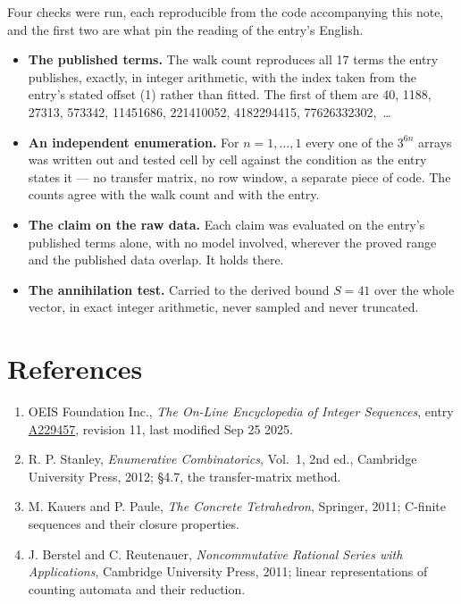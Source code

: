 \documentclass[11pt]{article}
\theoremstyle{definition}
\begin{document}
Four checks were run, each reproducible from the code accompanying this note, and the first two are what pin the reading of the entry's English.

\begin{itemize}

\item {\bfseries The published terms.} The walk count reproduces all 17 terms the entry publishes, exactly, in integer arithmetic, with the index taken from the entry's stated offset (1) rather than fitted. The first of them are 40, 1188, 27313, 573342, 11451686, 221410052, 4182294415, 77626332302,~\dots

\item {\bfseries An independent enumeration.} For $n = 1,\dots,1$ every one of the $3^{6n}$ arrays was written out and tested cell by cell against the condition as the entry states it --- no transfer matrix, no row window, a separate piece of code. The counts agree with the walk count and with the entry.

\item {\bfseries The claim on the raw data.} Each claim was evaluated on the entry's published terms alone, with no model involved, wherever the proved range and the published data overlap. It holds there.

\item {\bfseries The annihilation test.} Carried to the derived bound $S = 41$ over the whole vector, in exact integer arithmetic, never sampled and never truncated.

\end{itemize}

\section{References}

\begin{enumerate}

\item OEIS Foundation Inc., \emph{The On-Line Encyclopedia of Integer Sequences}, entry \href{https://oeis.org/A229457}{A229457}, revision 11, last modified Sep 25 2025.

\item R. P. Stanley, \emph{Enumerative Combinatorics}, Vol.~1, 2nd ed., Cambridge University Press, 2012; \S4.7, the transfer-matrix method.

\item M. Kauers and P. Paule, \emph{The Concrete Tetrahedron}, Springer, 2011; C-finite sequences and their closure properties.

\item J. Berstel and C. Reutenauer, \emph{Noncommutative Rational Series with Applications}, Cambridge University Press, 2011; linear representations of counting automata and their reduction.

\end{enumerate}
\end{document}
